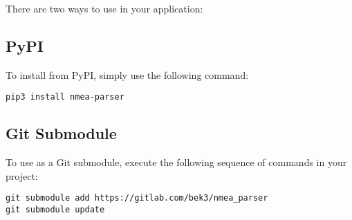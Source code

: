 
There are two ways to use \projname in your application:

\subsection{PyPI}

To install from PyPI, simply use the following command:

\begin{verbatim}
pip3 install nmea-parser
\end{verbatim}

\subsection{Git Submodule}

To use as a Git submodule, execute the following sequence of commands in your project:

\begin{verbatim}
git submodule add https://gitlab.com/bek3/nmea_parser
git submodule update
\end{verbatim} 


